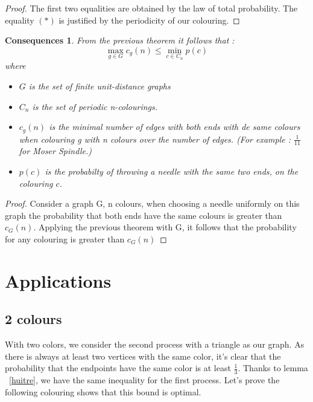 \documentclass[a4paper,11pt]{article}
\newtheorem{cons}{Consequences}
\theoremstyle{definition}
\theoremstyle{remark}
\begin{document}
\begin{proof}
The first two equalities are obtained by the law of total probability.
The equality $(*)$ is justified by the periodicity of our colouring.
\end{proof}

\begin{cons}
From the previous theorem it follows that :
$$ \max_{g \in G} c_g(n) \leq \min_{c \in C_n} p(c) $$
where \begin{itemize} 
  \item $G$ is the set of finite unit-distance graphs 
  \item $C_n$ is the set of periodic n-colourings.
  \item $c_g(n)$ is the minimal number of edges with both ends with de
same colours when colouring g with n colours over the number of edges.
(For example : $\frac 1 {11}$ for Moser Spindle.)
  \item $p(c)$ is the probabilty of throwing a needle with the same two
ends, on the colouring $c$.
\end{itemize}

\end{cons}

\begin{proof}
Consider a graph G, n colours, when choosing a needle
uniformly on this graph the probability that both ends have the same
colours is greater than $c_G(n)$. Applying the previous theorem with G, it follows
that the probability for any colouring is greater than $c_G(n)$    
\end{proof}

\section{Applications}
\subsection{2 colours}


With two colors, we consider the second process with a triangle as our graph. As there is always
 at least two vertices with the same color, it's clear that the 
probability that the endpoints have the same color is at least $\frac{1}{3}$. Thanks to lemma ~\ref{huitre}, we have the same inequality for the first process.
Let's prove the following colouring shows that this bound is optimal. 
\end{document}
